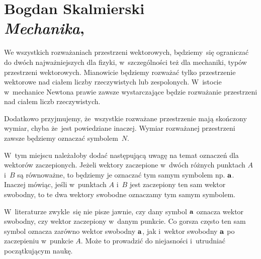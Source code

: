 \documentclass[a4paper,11pt]{article}
\numberwithin{equation}{section}
\begin{document}










\newpage

\section{ %
  Bogdan Skalmierski \\
  \textit{Mechanika}, \cite{SkalmierskiMechanika1998}}

\vspace{0em}



\vspace{0em}


We wszystkich rozważaniach przestrzeni wektorowych, będziemy~się ograniczać
do dwóch najważniejszych dla fizyki, w~szczególności też dla mechaniki,
typów przestrzeni wektorowych. Mianowicie będziemy rozważać tylko
przestrzenie wektorowe nad ciałem liczby rzeczywistych lub zespolonych.
W~istocie w~mechanice Newtona prawie zawsze wystarczające będzie rozważanie
przestrzeni nad ciałem liczb rzeczywistych.

Dodatkowo przyjmujemy, że~wszystkie rozważane przestrzenie mają skończony
wymiar, chyba że~jest powiedziane inaczej. Wymiar rozważanej przestrzeni
zawsze będziemy oznaczać symbolem~$N$.

\VerSpaceFour







\noindent
{} W~tym miejscu należałoby dodać następującą uwagę na temat oznaczeń
dla wektorów zaczepionych. Jeżeli wektory zaczepione w~dwóch różnych
punktach $A$ i~$B$ są równoważne, to będziemy je oznaczać tym samym symbolem
np. $\mathbf{a}$. Inaczej mówiąc, jeśli w~punktach $A$ i~$B$ jest zaczepiony
ten sam wektor swobodny, to te dwa wektory swobodne oznaczamy tym samym
symbolem.

W~literaturze zwykle~się nie pisze jawnie, czy dany symbol $\mathbf{a}$
oznacza wektor swobodny, czy wektor zaczepiony w~danym punkcie. Co gorsza
często ten sam symbol oznacza zarówno wektor swobodny $\mathbf{a}$, jak
i~wektor swobodny $\mathbf{a}$ po zaczepieniu w~punkcie $A$. Może to
prowadzić do niejasności i~utrudniać początkującym naukę.
\end{document}
